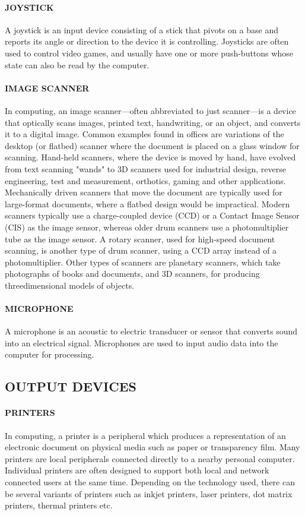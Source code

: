 	\paragraph {JOYSTICK}
	 A joystick is an input device consisting of a stick that pivots on a base and reports its angle or
	direction to the device it is controlling. Joysticks are often used to control video games, and usually
	have one or more push-buttons whose state can also be read by the computer.
	\paragraph {IMAGE SCANNER}
	 In computing, an image scanner—often abbreviated to just scanner—is a device that
	optically scans images, printed text, handwriting, or an object, and converts it to a digital image.
	Common examples found in offices are variations of the desktop (or flatbed) scanner where the
	document is placed on a glass window for scanning. Hand-held scanners, where the device is moved by
		hand, have evolved from text scanning "wands" to 3D scanners used for industrial design, reverse
	engineering, test and measurement, orthotics, gaming and other applications. Mechanically driven
	scanners that move the document are typically used for large-format documents, where a flatbed design
	would be impractical. Modern scanners typically use a charge-coupled device (CCD) or a Contact
	Image Sensor (CIS) as the image sensor, whereas older drum scanners use a photomultiplier tube as the
	image sensor. A rotary scanner, used for high-speed document scanning, is another type of drum
	scanner, using a CCD array instead of a photomultiplier. Other types of scanners are planetary
	scanners, which take photographs of books and documents, and 3D scanners, for producing threedimensional
	models of objects.
	\paragraph {MICROPHONE} 
	A microphone is an acoustic to electric transducer or sensor that converts sound into an
	electrical signal. Microphones are used to input audio data into the computer for processing.
		\subsection{ OUTPUT DEVICES}
		\paragraph{ PRINTERS}
	 In computing, a printer is a peripheral which produces a representation of an electronic
	document on physical media such as paper or transparency film. Many printers are local peripherals
	connected directly to a nearby personal computer. Individual printers are often designed to support both
	local and network connected users at the same time. Depending on the technology used, there can be
	several variants of printers such as inkjet printers, laser printers, dot matrix printers, thermal printers
	etc.
